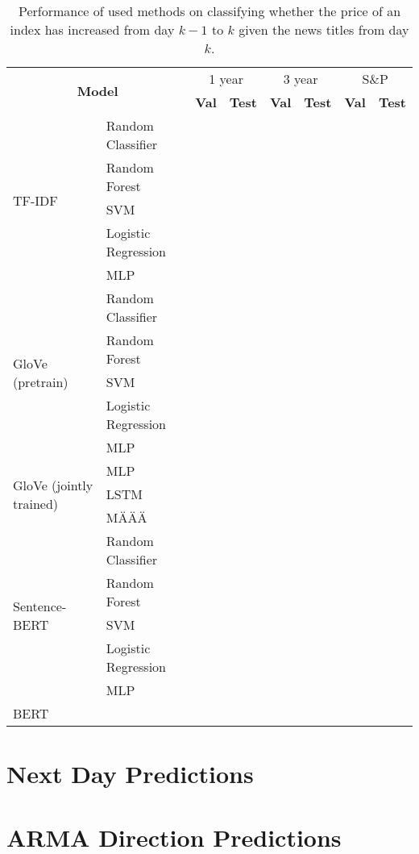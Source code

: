 \begin{table}[h]
    \centering
    \begin{tabular}{llrrrrrr}
    \hline
        \multicolumn{2}{c}{\multirow{2}{*}{\textbf{Model}}} & \multicolumn{2}{c}{1 year} & \multicolumn{2}{c}{3 year} & \multicolumn{2}{c}{S\&P} \\
      & & \textbf{Val} & \textbf{Test} & \textbf{Val} & \textbf{Test} & \textbf{Val} & \textbf{Test} \\
        \hline \hline   
        \multirow{5}{*}{TF-IDF} & Random Classifier & & \\
        & Random Forest & & \\
        & SVM & & \\
        & Logistic Regression & & \\
        & MLP & & \\
        \hline 
        \multirow{5}{*}{GloVe (pretrain)} & Random Classifier & & \\
        & Random Forest & & \\
        & SVM & & \\
        & Logistic Regression & & \\
        & MLP & & \\
        \hline 
        \multirow{3}{*}{GloVe (jointly trained)} & MLP & & \\
        & LSTM & & \\
        & MÄÄÄ & & \\
        \hline 
        \multirow{5}{*}{Sentence-BERT} & Random Classifier & & \\
        & Random Forest & & \\
        & SVM & & \\
        & Logistic Regression & & \\
        & MLP & & \\
        \hline
        BERT & & & \\
        \hline
    \end{tabular}
\caption{Performance of used methods on classifying whether the price of an index has increased from day $k-1$ to $k$ given the news titles from day $k$.}
\label{tab:rescdp}
\end{table}

\section{Next Day Predictions}
\section{ARMA Direction Predictions}
